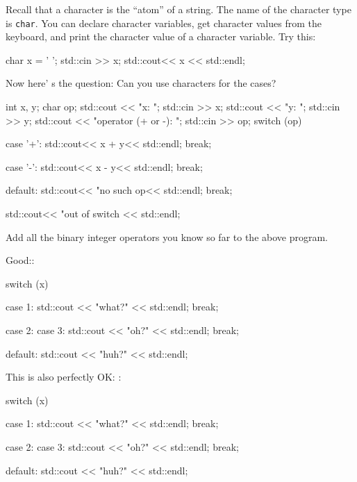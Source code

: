 \begin{ex}
Recall that a character is the ``atom'' of a string.
The name of the character type is \texttt{char}. You can declare character
variables, get character values from the keyboard, and print the
character value of a character variable. Try this:
\begin{console}
char x = ' ';
std::cin >> x;
std::cout<< x << std::endl;
\end{console}
Now here' s the question: Can you use characters for the
cases?
\begin{console}
int x, y;
char op;
std::cout << "x: ";
std::cin >> x;
std::cout << "y: ";
std::cin >> y;
std::cout << "operator (+ or -): ";
std::cin >> op;
switch (op)
{
        case '+':
             std::cout<< x + y<< std::endl;
             break;
             
        case '-':
             std::cout<< x - y<< std::endl;
             break;
        
        default:
             std::cout<< "no such op<<
             std::endl;
             break;
}
std::cout<< "out of switch << std::endl; 
\end{console}
\end{ex}
Add all the binary integer operators you know so far to the above
program.

\newpage{}

Good::
\begin{console}
switch (x)
{
        case 1:
             std::cout << "what?" << std::endl;
             break;
             
        case 2:
        case 3:
             std::cout << "oh?" << std::endl;
             break;
             
        default:
             std::cout << "huh?" << std::endl;
}

\end{console}
This is also perfectly OK: :
\begin{console}
switch (x)
{
        case 1:
        {
             std::cout << "what?" << std::endl;
             break;
        }
        
        case 2:
        case 3:
        {
             std::cout << "oh?" << std::endl;
             break;
        }
        
        default:
        {
             std::cout << "huh?" << std::endl;
        }
}
\end{console}
\newpage{}

